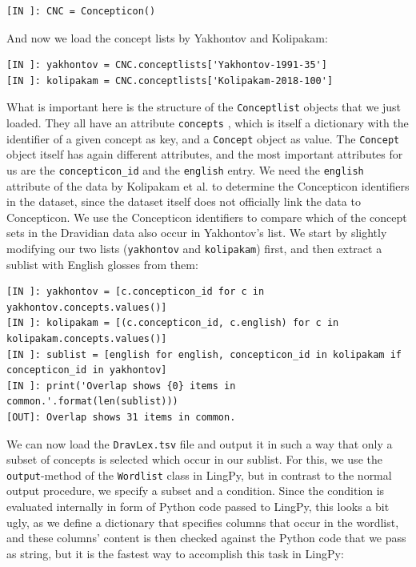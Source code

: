 \documentclass[
  a4paper,
  14pt,
  oneside,
  tablecaptionabove
]{scrbook}
\begin{document}
\begin{lstlisting}
[IN ]: CNC = Concepticon()
\end{lstlisting}

And now we load the concept lists by Yakhontov and Kolipakam:

\begin{lstlisting}
[IN ]: yakhontov = CNC.conceptlists['Yakhontov-1991-35']
[IN ]: kolipakam = CNC.conceptlists['Kolipakam-2018-100']
\end{lstlisting}

What is important here is the structure of the \lstinline!Conceptlist!
objects that we just loaded. They all have an attribute
\lstinline!concepts! , which is itself a dictionary with the identifier
of a given concept as key, and a \lstinline!Concept! object as value.
The \lstinline!Concept! object itself has again different attributes,
and the most important attributes for us are the
\lstinline!concepticon_id! and the \lstinline!english! entry. We need
the \lstinline!english! attribute of the data by Kolipakam et al. to
determine the Concepticon identifiers in the dataset, since the dataset
itself does not officially link the data to Concepticon. We use the
Concepticon identifiers to compare which of the concept sets in the
Dravidian data also occur in Yakhontov's list. We start by slightly
modifying our two lists (\lstinline!yakhontov! and
\lstinline!kolipakam!) first, and then extract a sublist with English
glosses from them:

\begin{lstlisting}
[IN ]: yakhontov = [c.concepticon_id for c in yakhontov.concepts.values()]
[IN ]: kolipakam = [(c.concepticon_id, c.english) for c in  kolipakam.concepts.values()]
[IN ]: sublist = [english for english, concepticon_id in kolipakam if concepticon_id in yakhontov]
[IN ]: print('Overlap shows {0} items in common.'.format(len(sublist))) 
[OUT]: Overlap shows 31 items in common.
\end{lstlisting}

We can now load the \lstinline!DravLex.tsv! file and output it in such a
way that only a subset of concepts is selected which occur in our
sublist. For this, we use the \lstinline!output!-method of the
\lstinline!Wordlist! class in LingPy, but in contrast to the normal
output procedure, we specify a subset and a condition. Since the
condition is evaluated internally in form of Python code passed to
LingPy, this looks a bit ugly, as we define a dictionary that specifies
columns that occur in the wordlist, and these columns' content is then
checked against the Python code that we pass as string, but it is the
fastest way to accomplish this task in LingPy:
\end{document}
